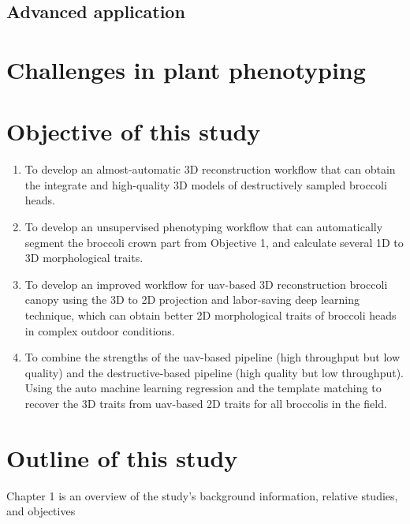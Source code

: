 


\subsection{Advanced application}


\section{Challenges in plant phenotyping}



\section{Objective of this study}

\begin{enumerate}
    \item To develop an almost-automatic 3D reconstruction workflow that can obtain the integrate and high-quality 3D models of destructively sampled broccoli heads.
    \item To develop an unsupervised phenotyping workflow that can automatically segment the broccoli crown part from Objective 1, and calculate several 1D to 3D morphological traits.
    \item To develop an improved workflow for \gls{uav}-based 3D reconstruction broccoli canopy using the 3D to 2D projection and labor-saving deep learning technique, which can obtain better 2D morphological traits of broccoli heads in complex outdoor conditions.
    \item To combine the strengths of the \gls{uav}-based pipeline (high throughput but low quality) and the destructive-based pipeline (high quality but low throughput). Using the auto machine learning regression and the template matching to recover the 3D traits from \gls{uav}-based 2D traits for all broccolis in the field.

\end{enumerate}


\section{Outline of this study}

Chapter 1 is an overview of the study's background information, relative studies, and objectives

